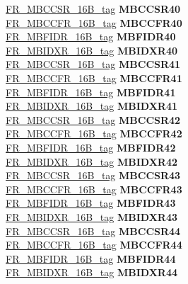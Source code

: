 \begin{DoxyCompactItemize}
\begin{tabbing}
\>\>\mbox{\hyperlink{unionFR__MBCCSR__16B__tag}{FR\_MBCCSR\_16B\_tag}} {\bfseries MBCCSR40}\\
\>\>\mbox{\hyperlink{unionFR__MBCCFR__16B__tag}{FR\_MBCCFR\_16B\_tag}} {\bfseries MBCCFR40}\\
\>\>\mbox{\hyperlink{unionFR__MBFIDR__16B__tag}{FR\_MBFIDR\_16B\_tag}} {\bfseries MBFIDR40}\\
\>\>\mbox{\hyperlink{unionFR__MBIDXR__16B__tag}{FR\_MBIDXR\_16B\_tag}} {\bfseries MBIDXR40}\\
\>\>\mbox{\hyperlink{unionFR__MBCCSR__16B__tag}{FR\_MBCCSR\_16B\_tag}} {\bfseries MBCCSR41}\\
\>\>\mbox{\hyperlink{unionFR__MBCCFR__16B__tag}{FR\_MBCCFR\_16B\_tag}} {\bfseries MBCCFR41}\\
\>\>\mbox{\hyperlink{unionFR__MBFIDR__16B__tag}{FR\_MBFIDR\_16B\_tag}} {\bfseries MBFIDR41}\\
\>\>\mbox{\hyperlink{unionFR__MBIDXR__16B__tag}{FR\_MBIDXR\_16B\_tag}} {\bfseries MBIDXR41}\\
\>\>\mbox{\hyperlink{unionFR__MBCCSR__16B__tag}{FR\_MBCCSR\_16B\_tag}} {\bfseries MBCCSR42}\\
\>\>\mbox{\hyperlink{unionFR__MBCCFR__16B__tag}{FR\_MBCCFR\_16B\_tag}} {\bfseries MBCCFR42}\\
\>\>\mbox{\hyperlink{unionFR__MBFIDR__16B__tag}{FR\_MBFIDR\_16B\_tag}} {\bfseries MBFIDR42}\\
\>\>\mbox{\hyperlink{unionFR__MBIDXR__16B__tag}{FR\_MBIDXR\_16B\_tag}} {\bfseries MBIDXR42}\\
\>\>\mbox{\hyperlink{unionFR__MBCCSR__16B__tag}{FR\_MBCCSR\_16B\_tag}} {\bfseries MBCCSR43}\\
\>\>\mbox{\hyperlink{unionFR__MBCCFR__16B__tag}{FR\_MBCCFR\_16B\_tag}} {\bfseries MBCCFR43}\\
\>\>\mbox{\hyperlink{unionFR__MBFIDR__16B__tag}{FR\_MBFIDR\_16B\_tag}} {\bfseries MBFIDR43}\\
\>\>\mbox{\hyperlink{unionFR__MBIDXR__16B__tag}{FR\_MBIDXR\_16B\_tag}} {\bfseries MBIDXR43}\\
\>\>\mbox{\hyperlink{unionFR__MBCCSR__16B__tag}{FR\_MBCCSR\_16B\_tag}} {\bfseries MBCCSR44}\\
\>\>\mbox{\hyperlink{unionFR__MBCCFR__16B__tag}{FR\_MBCCFR\_16B\_tag}} {\bfseries MBCCFR44}\\
\>\>\mbox{\hyperlink{unionFR__MBFIDR__16B__tag}{FR\_MBFIDR\_16B\_tag}} {\bfseries MBFIDR44}\\
\>\>\mbox{\hyperlink{unionFR__MBIDXR__16B__tag}{FR\_MBIDXR\_16B\_tag}} {\bfseries MBIDXR44}\\

\end{tabbing}
\end{DoxyCompactItemize}
